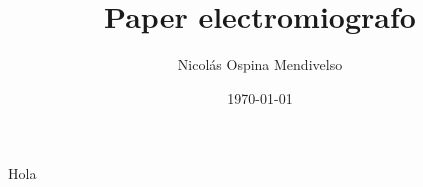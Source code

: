 \documentclass[oneside]{scrbook}
\title{Paper electromiografo}
\author{Nicolás Ospina Mendivelso}
\date{\today}
\begin{document}
 
\maketitle 

\frontmatter 
\tableofcontents 
\listoffigures 
\listoftables 





Hola \cite{webster2009medical}

 
 
%
%


\printbibliography
\end{document}
